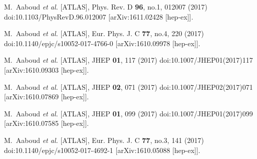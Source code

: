 \begin{thebibliography}{9}
M.~Aaboud \textit{et al.} [ATLAS],
Phys. Rev. D \textbf{96}, no.1, 012007 (2017)
doi:10.1103/PhysRevD.96.012007
[arXiv:1611.02428 [hep-ex]].

M.~Aaboud \textit{et al.} [ATLAS],
Eur. Phys. J. C \textbf{77}, no.4, 220 (2017)
doi:10.1140/epjc/s10052-017-4766-0
[arXiv:1610.09978 [hep-ex]].

M.~Aaboud \textit{et al.} [ATLAS],
JHEP \textbf{01}, 117 (2017)
doi:10.1007/JHEP01(2017)117
[arXiv:1610.09303 [hep-ex]].

M.~Aaboud \textit{et al.} [ATLAS],
JHEP \textbf{02}, 071 (2017)
doi:10.1007/JHEP02(2017)071
[arXiv:1610.07869 [hep-ex]].

M.~Aaboud \textit{et al.} [ATLAS],
JHEP \textbf{01}, 099 (2017)
doi:10.1007/JHEP01(2017)099
[arXiv:1610.07585 [hep-ex]].

M.~Aaboud \textit{et al.} [ATLAS],
Eur. Phys. J. C \textbf{77}, no.3, 141 (2017)
doi:10.1140/epjc/s10052-017-4692-1
[arXiv:1610.05088 [hep-ex]].


\end{thebibliography}
